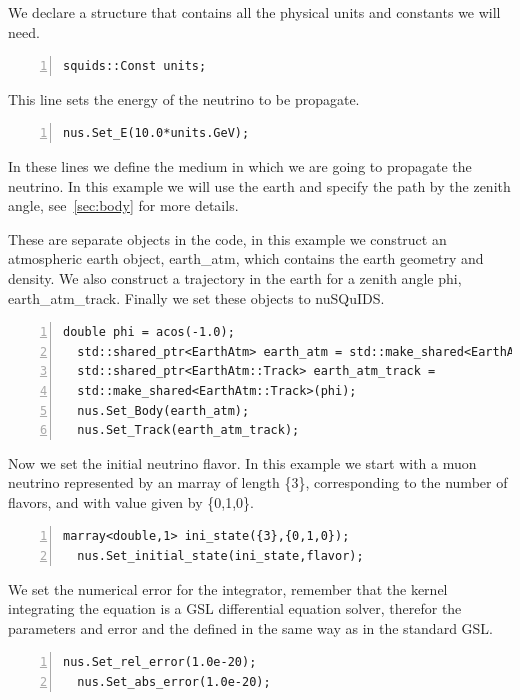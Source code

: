 We declare a structure that contains all the physical units and
constants we will need. 
\begin{lstlisting}[frame=leftline, numbers = left,breaklines=true, label = ex:sin1,firstnumber=last]
  squids::Const units;
\end{lstlisting}

This line sets the energy of the neutrino to be propagate.
\begin{lstlisting}[frame=leftline, numbers = left,breaklines=true, label = ex:sin1,firstnumber=last]
  nus.Set_E(10.0*units.GeV);
\end{lstlisting}

In these lines we define the medium in which we are going to propagate
the neutrino. In this example we will use the earth and specify the
path by the zenith angle, see~\ref{sec:body} for more details.

These are separate objects in the code, in this example we construct
an atmospheric earth object, {\ttf earth_atm}, which contains the
earth geometry and density. We also construct a trajectory in the
earth for a zenith angle {\ttf phi}, {\ttf earth_atm_track}. Finally
we set these objects to nuSQuIDS.

\begin{lstlisting}[frame=leftline, numbers = left,breaklines=true, label = ex:sin1,firstnumber=last]
  double phi = acos(-1.0);
  std::shared_ptr<EarthAtm> earth_atm = std::make_shared<EarthAtm>();
  std::shared_ptr<EarthAtm::Track> earth_atm_track =
  std::make_shared<EarthAtm::Track>(phi);
  nus.Set_Body(earth_atm);
  nus.Set_Track(earth_atm_track);
\end{lstlisting}

Now we set the initial neutrino flavor. In this example we start with
a muon neutrino represented by an {\ttf marray} of length {\ttf
  \{3\}}, corresponding to the number of flavors, and with value given
by {\ttf\{0,1,0\}}.


\begin{lstlisting}[frame=leftline, numbers = left,breaklines=true, label = ex:sin1,firstnumber=last]
  marray<double,1> ini_state({3},{0,1,0});
  nus.Set_initial_state(ini_state,flavor);
\end{lstlisting}

We set the numerical error for the integrator, remember that the
kernel integrating the equation is a GSL differential equation solver,
therefor the parameters and error and the defined in the same way as
in the standard GSL.
\begin{lstlisting}[frame=leftline, numbers = left,breaklines=true, label = ex:sin1,firstnumber=last]
  nus.Set_rel_error(1.0e-20);
  nus.Set_abs_error(1.0e-20);
\end{lstlisting}

